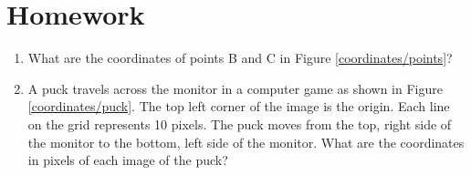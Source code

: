 \section*{Homework}

\begin{enumerate}
	\item What are the coordinates of points B and C in Figure \ref{coordinates/points}?
	\item A puck travels across the monitor in a computer game as shown in Figure \ref{coordinates/puck}. The top left corner of the image is the origin. Each line on the grid represents 10 pixels. The puck moves from the top, right side of the monitor to the bottom, left side of the monitor. What are the coordinates in pixels of each image of the puck?

	
\end{enumerate}